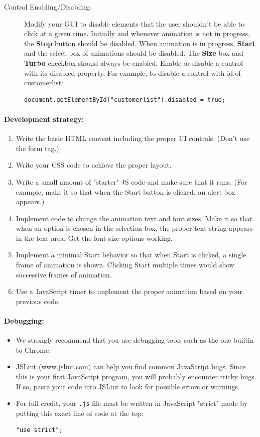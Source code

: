 \documentclass{article}
\newcommand{\myitem}{\paragraph}
\begin{document}
\begin{description}
\item[Control Enabling/Disabling:] Modify your GUI to disable
elements that the user shouldn't be able to click at a given time.
Initially and whenever animation is not in progress, the {\bf Stop} button
should be disabled.  When animation is in progress, {\bf Start} and the
select box of animations should be disabled.  The {\bf Size} box and
{\bf Turbo}
checkbox should always be enabled.  Enable or disable a control with
its disabled property.  For example, to disable a control with id of
customerlist:
\begin{Verbatim}[frame=single]
  document.getElementById("customerlist").disabled = true;
\end{Verbatim}

\end{description}

\myitem{Development strategy:}
\begin{enumerate}
  \item Write the basic HTML content
    including the proper UI controls.  (Don't use the form tag.)
  \item
    Write
    your CSS code to achieve the proper layout.
  \item
    Write a small amount
of "starter" JS code and make sure that it runs.  (For example, make
it so that when the Start button is clicked, an alert box appears.)
\item
  Implement code to change the animation text and font sizes.  Make
it so that when an option is chosen in the selection box, the proper
text string appears in the text area.  Get the font size options
working.
\item
  Implement a minimal Start behavior so that when Start is
clicked, a single frame of animation is shown. Clicking Start multiple
times would show successive frames of animation.
\item Use a JavaScript
timer to implement the proper animation based on your previous code.
\end{enumerate}

\myitem{Debugging:}

\begin{itemize}
\item
We strongly recommend that you use debugging tools
such as the one builtin to Chrome.  
\item
JSLint (\url{www.jslint.com}) can
help you find common JavaScript bugs.  Since this is your first
JavaScript program, you will probably encounter tricky bugs.  If so,
paste your code into JSLint to look for possible errors or warnings.
\item
  For full credit, your {\tt .js} file must be written in JavaScript "strict"
mode by putting this exact line of code at the top:
\begin{Verbatim}[frame=single]
  "use strict";
  \end{Verbatim}
\end{itemize}
\end{document}
